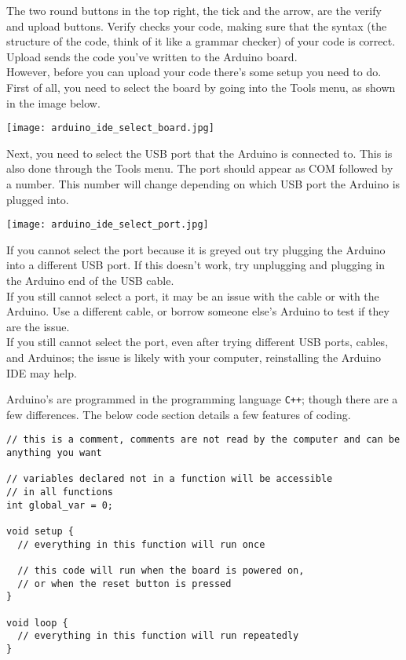 \documentclass[../TinyBot.tex]{subfiles}
\begin{document}
The two round buttons in the top right, the tick and the arrow, are the verify and upload buttons. Verify checks your code, making sure that the syntax (the structure of the code, think of it like a grammar checker) of your code is correct. Upload sends the code you've written to the Arduino board.  \\

However, before you can upload your code there's some setup you need to do. First of all, you need to select the board by going into the Tools menu, as shown in the image below. 

\begin{center}
  \texttt{[image: arduino\_ide\_select\_board.jpg]}
\end{center}

Next, you need to select the USB port that the Arduino is connected to. This is also done through the Tools menu. The port should appear as COM followed by a number. This number will change depending on which USB port the Arduino is plugged into. 

\begin{center}
  \texttt{[image: arduino\_ide\_select\_port.jpg]}
\end{center}

\begin{warningbox}
  If you cannot select the port because it is greyed out try plugging the Arduino into a different USB port. If this doesn't work, try unplugging and plugging in the Arduino end of the USB cable. \\

  If you still cannot select a port, it may be an issue with the cable or with the Arduino. Use a different cable, or borrow someone else's Arduino to test if they are the issue. \\

  If you still cannot select the port, even after trying different USB ports, cables, and Arduinos; the issue is likely with your computer, reinstalling the Arduino IDE may help. 
  
\end{warningbox}


\bigskip

Arduino's are programmed in the programming language \lstinline[]!C++!; though there are a few differences. The below code section details a few features of coding.


\begin{lstlisting}
// this is a comment, comments are not read by the computer and can be anything you want

// variables declared not in a function will be accessible
// in all functions
int global_var = 0;

void setup {
  // everything in this function will run once

  // this code will run when the board is powered on,
  // or when the reset button is pressed
}

void loop {
  // everything in this function will run repeatedly
}

\end{lstlisting}
\bigskip
\end{document}
